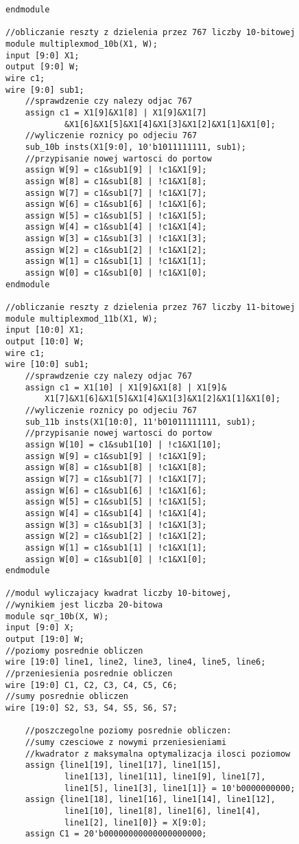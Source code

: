 \documentclass[a4paper]{article}
\begin{document}
\begin{lstlisting}[label=calosc]
endmodule

//obliczanie reszty z dzielenia przez 767 liczby 10-bitowej
module multiplexmod_10b(X1, W);
input [9:0] X1;
output [9:0] W;
wire c1;
wire [9:0] sub1;
	//sprawdzenie czy nalezy odjac 767
	assign c1 = X1[9]&X1[8] | X1[9]&X1[7]
		    &X1[6]&X1[5]&X1[4]&X1[3]&X1[2]&X1[1]&X1[0];
	//wyliczenie roznicy po odjeciu 767
	sub_10b insts(X1[9:0], 10'b1011111111, sub1);
	//przypisanie nowej wartosci do portow
	assign W[9] = c1&sub1[9] | !c1&X1[9];
	assign W[8] = c1&sub1[8] | !c1&X1[8];
	assign W[7] = c1&sub1[7] | !c1&X1[7];
	assign W[6] = c1&sub1[6] | !c1&X1[6];
	assign W[5] = c1&sub1[5] | !c1&X1[5];
	assign W[4] = c1&sub1[4] | !c1&X1[4];
	assign W[3] = c1&sub1[3] | !c1&X1[3];
	assign W[2] = c1&sub1[2] | !c1&X1[2];
	assign W[1] = c1&sub1[1] | !c1&X1[1];
	assign W[0] = c1&sub1[0] | !c1&X1[0];
endmodule

//obliczanie reszty z dzielenia przez 767 liczby 11-bitowej
module multiplexmod_11b(X1, W);
input [10:0] X1;
output [10:0] W;
wire c1;
wire [10:0] sub1;
	//sprawdzenie czy nalezy odjac 767
	assign c1 = X1[10] | X1[9]&X1[8] | X1[9]&
	    X1[7]&X1[6]&X1[5]&X1[4]&X1[3]&X1[2]&X1[1]&X1[0];
	//wyliczenie roznicy po odjeciu 767
	sub_11b insts(X1[10:0], 11'b01011111111, sub1);
	//przypisanie nowej wartosci do portow
	assign W[10] = c1&sub1[10] | !c1&X1[10];
	assign W[9] = c1&sub1[9] | !c1&X1[9];
	assign W[8] = c1&sub1[8] | !c1&X1[8];
	assign W[7] = c1&sub1[7] | !c1&X1[7];
	assign W[6] = c1&sub1[6] | !c1&X1[6];
	assign W[5] = c1&sub1[5] | !c1&X1[5];
	assign W[4] = c1&sub1[4] | !c1&X1[4];
	assign W[3] = c1&sub1[3] | !c1&X1[3];
	assign W[2] = c1&sub1[2] | !c1&X1[2];
	assign W[1] = c1&sub1[1] | !c1&X1[1];
	assign W[0] = c1&sub1[0] | !c1&X1[0];
endmodule

//modul wyliczajacy kwadrat liczby 10-bitowej, 
//wynikiem jest liczba 20-bitowa
module sqr_10b(X, W);
input [9:0] X;
output [19:0] W;
//poziomy posrednie obliczen
wire [19:0] line1, line2, line3, line4, line5, line6;
//przeniesienia posrednie obliczen
wire [19:0] C1, C2, C3, C4, C5, C6;
//sumy posrednie obliczen
wire [19:0] S2, S3, S4, S5, S6, S7;

	//poszczegolne poziomy posrednie obliczen:
	//sumy czesciowe z nowymi przeniesieniami
	//kwadrator z maksymalna optymalizacja ilosci poziomow
	assign {line1[19], line1[17], line1[15], 
		    line1[13], line1[11], line1[9], line1[7], 
		    line1[5], line1[3], line1[1]} = 10'b0000000000;
	assign {line1[18], line1[16], line1[14], line1[12], 
		    line1[10], line1[8], line1[6], line1[4], 
		    line1[2], line1[0]} = X[9:0];
	assign C1 = 20'b00000000000000000000;
	

\end{lstlisting}
\end{document}
